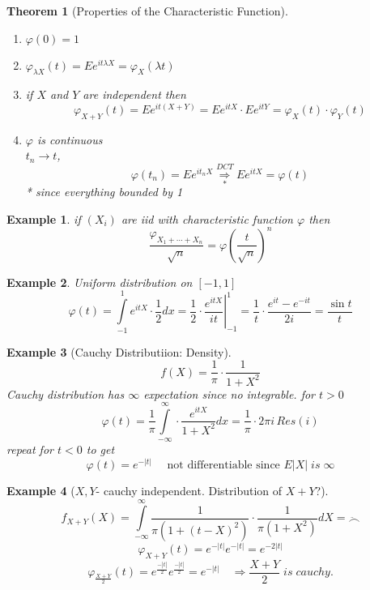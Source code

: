 \documentclass[12pt]{article}
\newtheorem{theorem}{Theorem}[section]
\newtheorem{example}{Example}[section]
\begin{document}
\begin{theorem}[Properties of the Characteristic Function]\quad \\
\begin{enumerate}[(1)]
\item $\varphi(0) = 1$
\item $\varphi_{\lambda X}(t) = Ee^{it\lambda X} = \varphi_X(\lambda t)$
\item if $X$ and $Y$ are independent then
\[\varphi_{X+Y}(t) = Ee^{it(X+Y)} = Ee^{itX}\cdot Ee^{itY}= \varphi_X(t)\cdot \varphi_Y(t)\]
\item $\varphi$ is continuous\\
$t_n \rightarrow t$,
\[\varphi(t_n) = Ee^{it_nX} \underset{*}{\overset{DCT}{\Rightarrow}} Ee^{itX} = \varphi(t)\]
* since everything bounded by 1
\end{enumerate}
\end{theorem}

\begin{example} if $(X_i)$ are iid with characteristic function $\varphi$ then
\[\frac{\varphi_{X_1 + \cdots + X_n}}{\sqrt{n}} = \varphi(\frac{t}{\sqrt{n}})^n \]
\end{example}


\begin{example}Uniform distribution on $[-1,1]$
\[\varphi(t) = \int\limits_{-1}^{1}e^{itX}\cdot\frac{1}{2}dx =\left. \frac{1}{2}\cdot \frac{e^{itX}}{it}\right|_{-1}^{1} = \frac{1}{t}\cdot \frac{e^{it}-e^{-it}}{2i} = \frac{\sin t}{t}\]
\end{example}

\begin{example}[Cauchy Distributiion: Density]
\[f(X) = \frac{1}{\pi}\cdot \frac{1}{1 +X^2} \]
Cauchy distribution has $\infty$ expectation since no integrable.
for $t>0$
\[\varphi(t) =  \frac{1}{\pi}\int\limits_{-\infty}^{\infty}\cdot \frac{e^{itX}}{1 +X^2}dx =  \frac{1}{\pi}\cdot 2\pi i \,Res(i) \]
repeat for $t<0$ to get 
\[\varphi(t) = e^{-|t|}  \quad \text{ not differentiable since }E|X| \; is \; \infty\]
\end{example}

\begin{example}[$X,Y$- cauchy independent. Distribution of $X+Y$?]
\[f_{X+Y}(X) = \int\limits_{-\infty}^{\infty}\frac{1}{\pi (1+(t-X)^2)} \cdot \frac{1}{\pi(1 +X^2)}dX = \ddot\frown \]
\[\varphi_{X+Y}(t) = e^{-|t|}e^{-|t|} = e^{-2|t|}\]
\[\varphi_{\frac{X+Y}{2}}(t) = e^{\frac{-|t|}{2}}e^{\frac{-|t|}{2}} = e^{-|t|} \quad \Rightarrow \frac{X+Y}{2} \;is \; cauchy.\]
\end{example}
\end{document}
